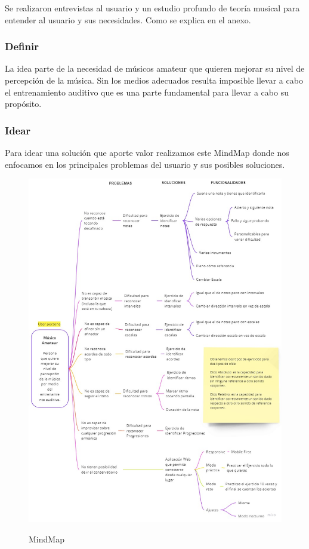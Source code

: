 \documentclass[12pt,twoside,titlepage]{report}
\begin{document}
Se realizaron entrevistas al usuario y un estudio profundo de teoría musical para entender al usuario y sus necesidades. Como se explica en el anexo.

\subsubsection{Definir}

La idea parte de la necesidad de músicos amateur que quieren mejorar su nivel de percepción de la música. Sin los medios adecuados resulta imposible llevar a cabo el entrenamiento auditivo que es una parte fundamental para llevar a cabo su propósito. 

\subsubsection{Idear}

Para idear una solución que aporte valor realizamos este MindMap donde nos enfocamos en los principales problemas del usuario y sus posibles soluciones.

\begin{figure}[H]
    \centering
    \includegraphics[scale=0.47]{MINDMAP}
    \label{fig:Mindmap}
    \caption{MindMap}
\end{figure}
\end{document}
